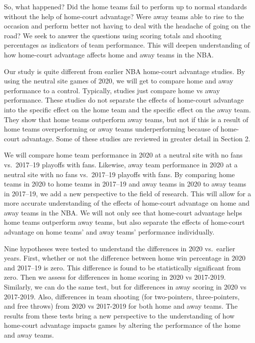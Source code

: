 \documentclass[10pt]{article}
\begin{document}
So, what happened? Did the home teams fail to perform up to normal standards
without the help of home-court advantage? Were away teams able to rise to
the occasion and perform better not having to deal with the headache of going
on the road? We seek to answer the questions using scoring totals and shooting
percentages as indicators of team performance. This will deepen understanding
of how home-court advantage affects home and away teams in the NBA.

Our study is quite different from earlier NBA home-court advantage studies.
By using the neutral site games of 2020, we will get to compare home and away
performance to a control. Typically, studies just compare home vs away
performance. These studies do not separate the effects of home-court advantage
into the specific effect on the home team and the specific effect on the away
team. They show that home teams outperform away teams, but not if this is a
result of home teams overperforming or away teams underperforming because of
home-court advantage. Some of these studies are reviewed in greater detail in Section 2.

We will compare home team performance in 2020 at a neutral site with
no fans vs.~2017--19 playoffs with fans. Likewise, away team performance in 2020
at a neutral site with no fans vs.~2017--19 playoffs with fans. By comparing home
teams in 2020 to home teams in 2017--19 and away teams in 2020 to away teams in
2017--19, we add a new perspective to the field of research. This will allow for
a more accurate understanding of the effects of home-court advantage on home and
away teams in the NBA. We will not only see that home-court advantage helps home
teams outperform away teams, but also separate the
effects of home-court advantage on home teams' and away teams' performance individually.

Nine hypotheses were tested to understand the differences in 2020 vs.~earlier
years. First, whether or not the difference between home win percentage in 2020
and 2017--19 is zero. This difference is found to be statistically
significant from zero. Then we assess for differences in home
scoring in 2020 vs 2017-2019. Similarly, we can do the same test, but for
differences in away scoring in 2020 vs 2017-2019. Also, differences in team
shooting (for two-pointers, three-pointers, and free throws) from 2020 vs 2017-2019
for both home and away teams. The results from these tests bring a new perspective
to the understanding of how home-court advantage impacts games by altering the performance
of the home and away teams.
\end{document}
